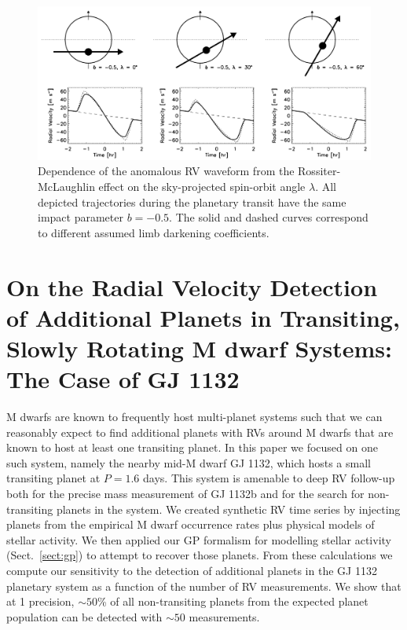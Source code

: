\begin{figure}
  \centering
  \includegraphics[width=.9\textwidth]{figures/RMeffect.png}
  \caption[Measuring the sky-projected spin-orbit angle using the RM effect.]
          {Dependence of the anomalous RV waveform from the
            Rossiter-McLaughlin effect on the sky-projected spin-orbit angle
            $\lambda$. All depicted trajectories during the planetary transit
            have the same impact parameter $b=-0.5$. The solid and dashed curves
            correspond to different assumed limb darkening coefficients. 
          \citep[Image credit:][]{gaudi07}}
  \label{fig:RMillust}
\end{figure}


\section{On the Radial Velocity Detection of Additional Planets in Transiting,
  Slowly Rotating M dwarf Systems: The Case of GJ 1132 \citep{cloutier17a}}
\label{app:gj1132}
M dwarfs are known to frequently host multi-planet systems such that we can
reasonably expect to find additional planets with RVs around M dwarfs that
are known to host at
least one transiting planet. In this paper we focused on one such
system, namely the nearby mid-M dwarf GJ 1132, which hosts a small transiting
planet at $P=1.6$ days. This system is amenable to deep RV follow-up both for
the precise mass measurement of GJ 1132b and for the search for non-transiting
planets in the system. We created synthetic RV time series
by injecting planets from the empirical M dwarf occurrence rates plus physical
models of stellar activity. We then applied our GP formalism for modelling
stellar activity (Sect.~\ref{sect:gp}) to attempt to recover those planets.
From these calculations we compute our sensitivity to the detection of additional
planets in the GJ 1132 planetary system as a function of the number of RV
measurements. We show that at 1 \mps{} precision, $\sim 50$\% of all non-transiting
planets from the expected planet population can be detected with $\sim 50$
measurements. \\

